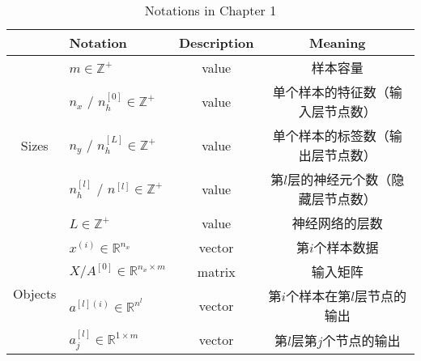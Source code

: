 \begin{table}[htb!]
    \centering
    \begin{threeparttable}
    \caption{Notations in Chapter 1}
    \begin{tabular}{clcc}
        \toprule
                                    & \textbf{Notation}                                     & \textbf{Description} & \textbf{Meaning}                                                   \\ 
        \midrule
        \multirow{5}{*}{Sizes}      & $m \in \mathbb{Z}^+$                                  & value                & 样本容量                                                               \\
                                    & $n_x$ / $n_h^{[0]} \in \mathbb{Z}^+$                  & value                & 单个样本的特征数（输入层节点数）                                         \\
                                    & $n_y$ / $n_h^{[L]} \in \mathbb{Z}^+$                  & value                & 单个样本的标签数（输出层节点数）                                      \\
                                    & $n_h^{[l]}$ / $n^{[l]} \in \mathbb{Z}^+$              & value                & 第$l$层的神经元个数（隐藏层节点数）                                   \\
                                    & $L \in \mathbb{Z}^+$                                  & value                & 神经网络的层数                                                         \\ 
        \midrule
        \multirow{12}{*}{Objects}   & $x^{(i)} \in \mathbb{R}^{n_x}$                        & vector               & 第$i$个样本数据                                                          \\
                                    & $X / A^{[0]} \in {\mathbb{R}^{n_x \times m}}$         & matrix               & 输入矩阵                                                               \\
                                    & $a^{[l](i)} \in \mathbb{R}^{n^{l}}$                   & vector               & 第$i$个样本在第$l$层节点的输出                                                  \\
                                    & $a_j^{[l]} \in \mathbb{R}^{1 \times {m}}$             & vector               & 第$l$层第$j$个节点的输出                                                         \\

\end{tabular}
\end{threeparttable}
\end{table}
